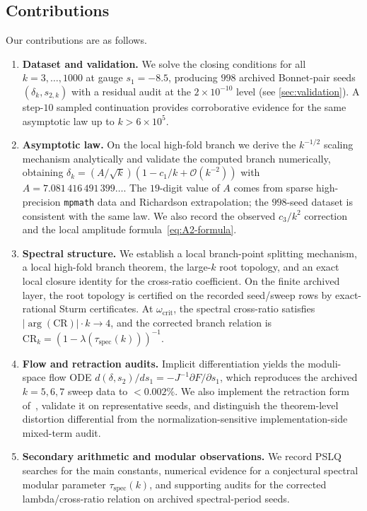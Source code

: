 \documentclass[11pt,a4paper]{article}
\theoremstyle{plain}
\theoremstyle{definition}
\theoremstyle{remark}
\newcommand{\Oo}{\mathcal{O}}
\begin{document}
\subsection{Contributions}
Our contributions are as follows.
\begin{enumerate}[label=\textbf{C\arabic*}.,nosep]
\item \textbf{Dataset and validation.}
  We solve the closing conditions for all $k=3,\ldots,1000$ at gauge
  $s_1=-8.5$, producing $998$ archived Bonnet-pair seeds
  $(\delta_k,s_{2,k})$ with a residual audit at the
  $2\times10^{-10}$ level (see \cref{sec:validation}).  A step-$10$ sampled
  continuation provides corroborative evidence for the same asymptotic
  law up to $k>6\times 10^5$.
\item \textbf{Asymptotic law.}
  On the local high-fold branch we derive the $k^{-1/2}$ scaling
  mechanism analytically and validate the computed branch numerically,
  obtaining $\delta_k=(A/\sqrt{k})(1-c_1/k+\Oo(k^{-2}))$ with
  $A=7.081\,416\,491\,399\ldots$.  The $19$-digit value of $A$ comes
  from sparse high-precision \texttt{mpmath} data and Richardson
  extrapolation; the $998$-seed dataset is consistent with the same
  law.  We also record the observed $c_3/k^2$ correction and the local
  amplitude formula~\eqref{eq:A2-formula}.
\item \textbf{Spectral structure.}
  We establish a local branch-point splitting mechanism, a local
  high-fold branch theorem, the large-$k$ root topology, and an exact
  local closure identity for the cross-ratio coefficient.  On the
  finite archived layer, the root topology is certified on the
  recorded seed/sweep rows by exact-rational Sturm certificates.  At
  $\omega_{\mathrm{crit}}$, the spectral
  cross-ratio satisfies $\lvert\arg(\mathrm{CR})\rvert\cdot k\to4$,
  and the corrected branch relation is
  $\mathrm{CR}_k=(1-\lambda(\tau_{\mathrm{spec}}(k)))^{-1}$.
\item \textbf{Flow and retraction audits.}
  Implicit differentiation yields the moduli-space flow ODE
  $d(\delta,s_2)/ds_1=-J^{-1}\partial F/\partial s_1$, which
  reproduces the archived $k=5,6,7$ sweep data to $<0.002\%$.  We also
  implement the retraction form of~\cite{BCHR25}, validate it on
  representative seeds, and distinguish the theorem-level distortion
  differential from the normalization-sensitive implementation-side
  mixed-term audit.
\item \textbf{Secondary arithmetic and modular observations.}
  We record PSLQ searches for the main constants,
  numerical evidence for a conjectural spectral modular parameter
  $\tau_{\mathrm{spec}}(k)$, and supporting audits for the corrected
  lambda/cross-ratio relation on archived spectral-period seeds.
\end{enumerate}
\end{document}
